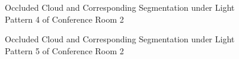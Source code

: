 \documentclass[11pt, a4paper,oneside,chapterprefix=false]{scrbook}
\begin{document}
\begin{figure}[H]
    \centering
      \label{fig:conf2 4 occluded} \hfill
     \label{fig:conf2 4 seg}
    \caption{Occluded Cloud and Corresponding Segmentation  under Light Pattern 4 of Conference Room 2}
    \label{fig:conf2 4 occ and seg}
\end{figure}

\begin{figure}[H]
    \centering
      \label{fig:conf2 5 occluded} \hfill
     \label{fig:conf2 5 seg}
    \caption{Occluded Cloud and Corresponding Segmentation under Light Pattern 5 of Conference Room 2}
    \label{fig:conf2 5 occ and seg}
\end{figure}
\end{document}
